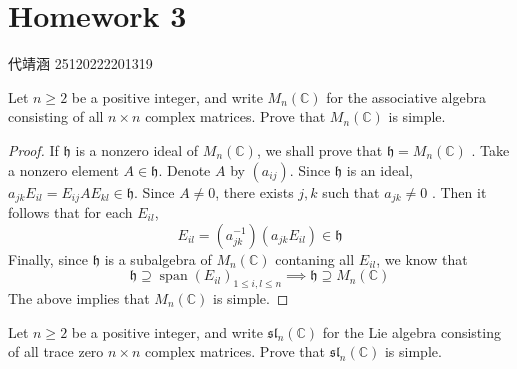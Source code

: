 \documentclass[../main.tex]{subfiles}
\begin{document}
\ifSubfilesClassLoaded{

    
    \setcounter{chapter}{2}
}{}

\chapter{ Homework 3 }
代靖涵 25120222201319
\begin{exercise}{}{}
Let $n \ge 2$ be a positive integer, and write $M_n(\mathbb{C})$ for the associative algebra consisting of all $n \times n$ complex matrices. Prove that $M_n(\mathbb{C})$ is simple.
\end{exercise}

\begin{proof}
    If \(  \mathfrak{h}  \) is a nonzero ideal of \(  M_{n}\left( \mathbb{C}  \right)   \), we shall prove that \(  \mathfrak{h}= M_{n}\left( \mathbb{C}  \right)   \)   . Take a nonzero element \(  A \in \mathfrak{h}  \). Denote \(  A  \) by \(  \left( a_{ij} \right)   \). Since \(    \mathfrak{h}    \) is an ideal,      \( a_{jk}E_{il}=  E_{ij}AE_{kl} \in   \mathfrak{h}  \).   Since \(  A\neq 0  \), there exists \(  j,k \) such that \(  a_{jk}\neq 0  \)  . Then it follows that for each \(  E_{il}  \),  \[
    E_{il}= \left( a_{jk}^{-1}  \right)\left( a_{jk}E_{il}\right)\in   \mathfrak{h}  
    \] Finally, since \(  \mathfrak{h} \) is a subalgebra of \(  M_{n}\left( \mathbb{C}  \right)   \) contaning all \(  E_{il}  \), we know that \[
     \mathfrak{h}\supseteq \operatorname{span}\left( E_{il} \right)_{1\le i,l\le n}\implies \mathfrak{h}\supseteq M_{n}\left( \mathbb{C}  \right)  
    \]   The above implies that \(  M_{n}\left( \mathbb{C}  \right)    \) is simple. 
\end{proof}
\begin{exercise}{}{}
Let $n \ge 2$ be a positive integer, and write $\mathfrak{sl}_n(\mathbb{C})$ for the Lie algebra consisting of all trace zero $n \times n$ complex matrices. Prove that $\mathfrak{sl}_n(\mathbb{C})$ is simple.
\end{exercise}
\end{document}
